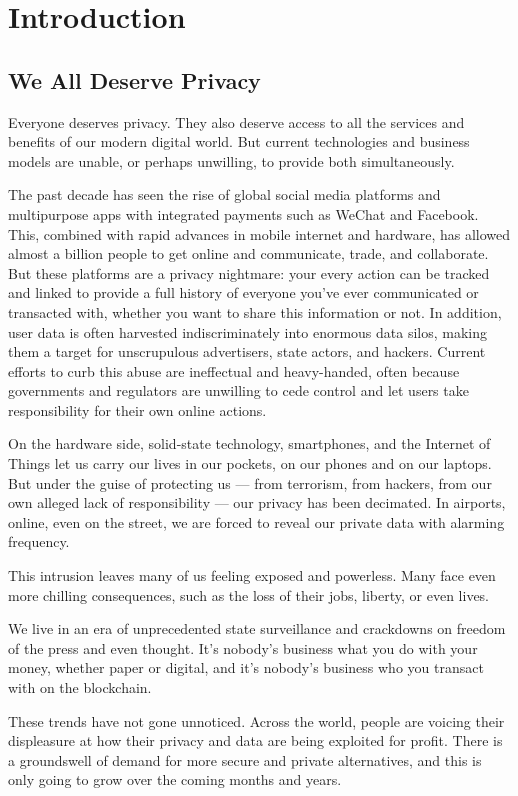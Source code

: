 \documentclass[8pt,fleqn,openany]{book}
\begin{document}
\chapter{Introduction}\label{chap:intro}

\section{We All Deserve Privacy}
Everyone deserves privacy. They also deserve access to all the services and benefits of our modern digital world. But current technologies and business models are unable, or perhaps unwilling, to provide both simultaneously.
	
The past decade has seen the rise of global social media platforms and multipurpose apps with integrated payments such as WeChat and Facebook. This, combined with rapid advances in mobile internet and hardware, has allowed almost a billion people to get online and communicate, trade, and collaborate. But these platforms are a privacy nightmare: your every action can be tracked and linked to provide a full history of everyone you've ever communicated or transacted with, whether you want to share this information or not. In addition, user data is often harvested indiscriminately into enormous data silos, making them a target for unscrupulous advertisers, state actors, and hackers. Current efforts to curb this abuse are ineffectual and heavy-handed, often because governments and regulators are unwilling to cede control and let users take responsibility for their own online actions.

On the hardware side, solid-state technology, smartphones, and the Internet of Things let us carry our lives in our pockets, on our phones and on our laptops. But under the guise of protecting us — from terrorism, from hackers, from our own alleged lack of responsibility — our privacy has been decimated. In airports, online, even on the street, we are forced to reveal our private data with alarming frequency.

This intrusion leaves many of us feeling exposed and powerless. Many face even more chilling consequences, such as the loss of their jobs, liberty, or even lives. 

We live in an era of unprecedented state surveillance and crackdowns on freedom of the press and even thought. It’s nobody’s business what you do with your money, whether paper or digital, and it’s nobody's business who you transact with on the blockchain.

These trends have not gone unnoticed. Across the world, people are voicing their displeasure at how their privacy and data are being exploited for profit. There is a groundswell of demand for more secure and private alternatives, and this is only going to grow over the coming months and years.
\end{document}
